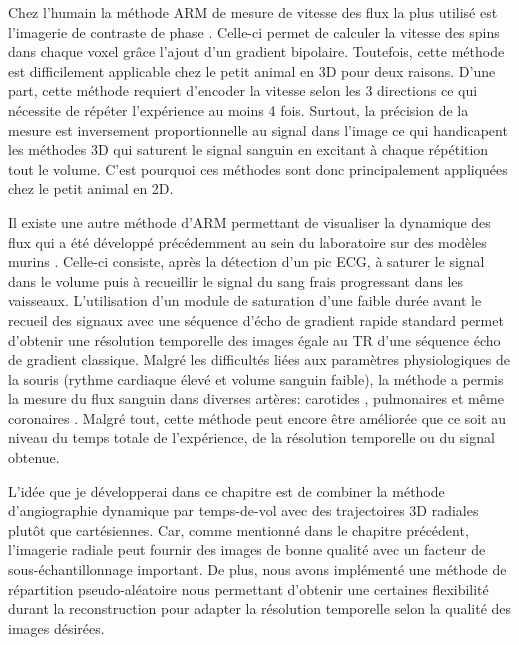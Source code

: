 Chez l'humain la méthode ARM de mesure de vitesse des flux la plus utilisé est l'imagerie de contraste de phase \cite{Petersson:2015aa}. Celle-ci permet de calculer la vitesse des spins dans chaque voxel grâce l'ajout d'un gradient bipolaire. Toutefois, cette méthode est difficilement applicable chez le petit animal en 3D pour deux raisons. D'une part, cette méthode requiert d'encoder la vitesse selon les 3 directions ce qui nécessite de répéter l'expérience au moins 4 fois. Surtout, la précision de la mesure est inversement proportionnelle au signal dans l'image ce qui handicapent les méthodes 3D qui saturent le signal sanguin en excitant à chaque répétition tout le volume. C'est pourquoi ces méthodes sont donc principalement appliquées chez le petit animal en 2D. 

Il existe une autre méthode d'ARM permettant de visualiser la dynamique des flux qui a été développé précédemment au sein du laboratoire sur des modèles murins \cite{Miraux:2006fu}. Celle-ci consiste, après la détection d'un pic ECG, à saturer le signal dans le volume puis à recueillir le signal du sang frais progressant dans les vaisseaux. L'utilisation d'un module de saturation d'une faible durée avant le recueil des signaux avec une séquence d'écho de gradient rapide standard permet d'obtenir une résolution temporelle des images égale au TR d'une séquence écho de gradient classique. Malgré les difficultés liées aux paramètres physiologiques de la souris (rythme cardiaque élevé et volume sanguin faible), la méthode a permis la mesure du flux sanguin dans diverses artères: carotides \cite{Miraux:2006fu}, pulmonaires \cite{Cochet:2013dk} et même coronaires \cite{Cochet:2010ec}. Malgré tout, cette méthode peut encore être améliorée que ce soit au niveau du temps totale de l'expérience, de la résolution temporelle ou du signal obtenue.


L'idée que je développerai dans ce chapitre est de combiner la méthode d'angiographie dynamique par temps-de-vol avec des trajectoires 3D radiales plutôt que cartésiennes. Car, comme mentionné dans le chapitre précédent, l'imagerie radiale peut fournir des images de bonne qualité avec un facteur de sous-échantillonnage important. De plus, nous avons implémenté une méthode de répartition pseudo-aléatoire nous permettant d'obtenir une certaines flexibilité durant la reconstruction pour adapter la résolution temporelle selon la qualité des images désirées.

